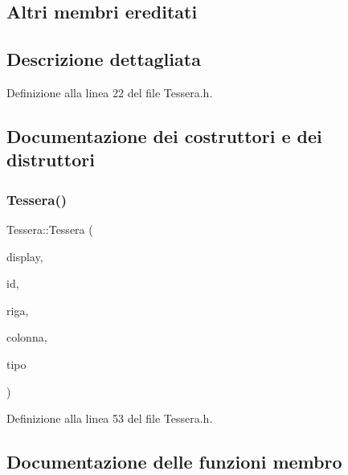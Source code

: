 \subsection*{Altri membri ereditati}


\subsection{Descrizione dettagliata}


Definizione alla linea 22 del file Tessera.\+h.



\subsection{Documentazione dei costruttori e dei distruttori}
\mbox{\label{class_tessera_ad0a1710afcd9bd7297522f0d820003f4}} 
\subsubsection{\texorpdfstring{Tessera()}{Tessera()}}
{\footnotesize\ttfamily Tessera\+::\+Tessera (\begin{DoxyParamCaption}\item[{A\+L\+L\+E\+G\+R\+O\+\_\+\+D\+I\+S\+P\+L\+AY $\ast$}]{display,  }\item[{unsigned}]{id,  }\item[{unsigned}]{riga,  }\item[{unsigned}]{colonna,  }\item[{\hyperlink{_tessera_8h_a210ad8ee967d754da5f1a1b374663556}{T\+I\+P\+O\+L\+O\+G\+IA}}]{tipo }\end{DoxyParamCaption})\hspace{0.3cm}{\ttfamily [inline]}}



Definizione alla linea 53 del file Tessera.\+h.



\subsection{Documentazione delle funzioni membro}
\mbox{\label{class_tessera_ac9b40eb79b65dc318b21b807ce8ded98}} 
